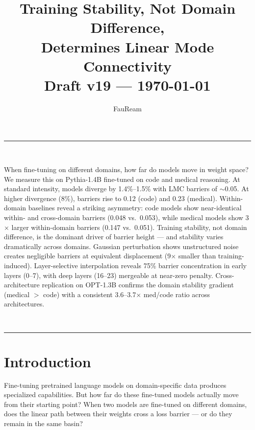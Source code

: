 \documentclass[11pt,a4paper]{article}
\title{\textbf{Training Stability, Not Domain Difference,\\[4pt]
               Determines Linear Mode Connectivity}\\[8pt]
       \large Draft v19 — \today}
\author{FauReam}
\date{}
\begin{document}
\maketitle
\thispagestyle{fancy}

\begin{center}
\rule{0.95\textwidth}{0.5pt}\\[4pt]
\begin{minipage}{0.92\textwidth}
\small
When fine-tuning on different domains, how far do models move in weight space? We measure this on Pythia-1.4B fine-tuned on code and medical reasoning. At standard intensity, models diverge by 1.4\%--1.5\% with LMC barriers of $\sim$0.05. At higher divergence (8\%), barriers rise to 0.12 (code) and 0.23 (medical). Within-domain baselines reveal a striking asymmetry: code models show near-identical within- and cross-domain barriers (0.048 vs.\ 0.053), while medical models show 3$\times$ larger within-domain barriers (0.147 vs.\ 0.051). Training stability, not domain difference, is the dominant driver of barrier height — and stability varies dramatically across domains. Gaussian perturbation shows unstructured noise creates negligible barriers at equivalent displacement (9$\times$ smaller than training-induced). Layer-selective interpolation reveals 75\% barrier concentration in early layers (0--7), with deep layers (16--23) mergeable at near-zero penalty. Cross-architecture replication on OPT-1.3B confirms the domain stability gradient (medical $>$ code) with a consistent 3.6--3.7$\times$ med/code ratio across architectures.
\end{minipage}\\[4pt]
\rule{0.95\textwidth}{0.5pt}
\end{center}

\section{Introduction}

Fine-tuning pretrained language models on domain-specific data produces specialized capabilities. But how far do these fine-tuned models actually move from their starting point? When two models are fine-tuned on different domains, does the linear path between their weights cross a loss barrier — or do they remain in the same basin?
\end{document}
